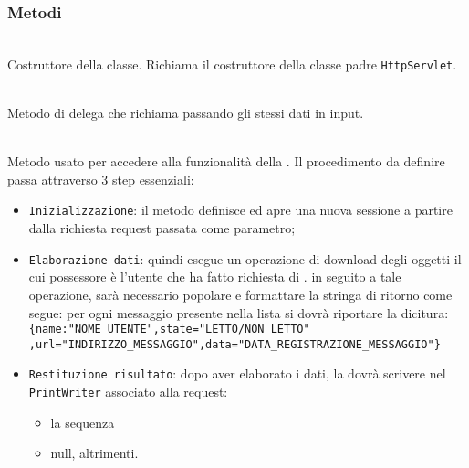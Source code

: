 \subsubsection*{Metodi}
\begin{description}
	\item{}\\
	Costruttore della classe. Richiama il costruttore della classe padre \texttt{HttpServlet}.
	
	\item{}\\
	Metodo di delega che richiama  passando gli stessi dati in input.
	
	\item{}\\
	Metodo usato per accedere alla funzionalità della . Il procedimento da definire passa attraverso 3 step essenziali:
	\begin{itemize}
		\item \texttt{Inizializzazione}: il metodo definisce ed apre una nuova sessione a partire dalla richiesta request passata come parametro;
		\item \texttt{Elaborazione dati}: quindi esegue un operazione di download degli oggetti  il cui possessore è l'utente che ha fatto richiesta di . in seguito a tale operazione, sarà necessario popolare e formattare la stringa di ritorno come segue: per ogni messaggio presente nella lista si dovrà riportare la dicitura:\\
		
		\verb|{name:"NOME_UTENTE",state="LETTO/NON LETTO"|\\
		\verb|,url="INDIRIZZO_MESSAGGIO",data="DATA_REGISTRAZIONE_MESSAGGIO"}|\\
	
		\item \texttt{Restituzione risultato}: dopo aver elaborato i dati, la  dovrà scrivere nel \texttt{PrintWriter} associato alla request:
			\begin{itemize}
				\item la sequenza
				\item null, altrimenti.
			\end{itemize}
	\end{itemize}

\end{description}

